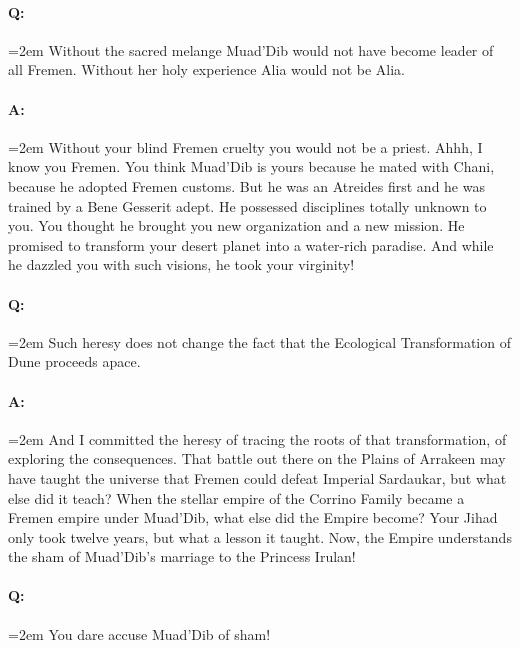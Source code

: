 \documentclass[a4paper, 12pt, oldfontcommands, final]{memoir}
\begin{document}
\paragraph{Q:} \hangindent=2em Without the sacred melange Muad'Dib would not have become leader of all Fremen. Without her holy experience Alia would not be Alia.
\paragraph{A:} \hangindent=2em Without your blind Fremen cruelty you would not be a priest. Ahhh, I know you Fremen. You think Muad'Dib is yours because he mated with Chani, because he adopted Fremen customs. But he was an Atreides first and he was trained by a Bene Gesserit adept. He possessed disciplines totally unknown to you. You thought he brought you new organization and a new mission. He promised to transform your desert planet into a water-rich paradise. And while he dazzled you with such visions, he took your virginity!
\paragraph{Q:} \hangindent=2em Such heresy does not change the fact that the Ecological Transformation of Dune proceeds apace.
\paragraph{A:} \hangindent=2em And I committed the heresy of tracing the roots of that transformation, of exploring the consequences. That battle out there on the Plains of Arrakeen may have taught the universe that Fremen could defeat Imperial Sardaukar, but what else did it teach? When the stellar empire of the Corrino Family became a Fremen empire under Muad'Dib, what else did the Empire become? Your Jihad only took twelve years, but what a lesson it taught. Now, the Empire understands the sham of Muad'Dib's marriage to the Princess Irulan!
\paragraph{Q:} \hangindent=2em You dare accuse Muad'Dib of sham!
\end{document}
